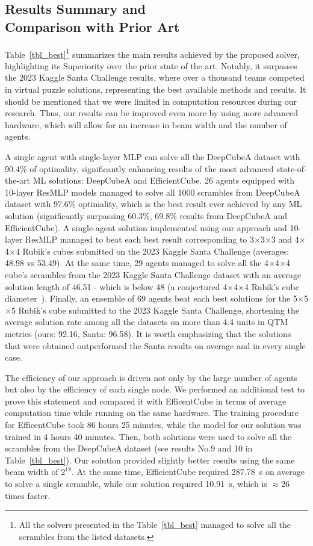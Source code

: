 
\subsection{\label{sec_best} Results Summary and \texorpdfstring{\\}{} Comparison with Prior Art}

Table~\ref{tbl_best}\footnote{All the solvers presented in the Table~\ref{tbl_best} managed to solve all the scrambles from the listed datasets.} summarizes the main results achieved by the proposed solver, highlighting its Superiority over the prior state of the art. Notably, it surpasses the 2023 Kaggle Santa Challenge results, where over a thousand teams competed in virtual puzzle solutions, representing the best available methods and results. It should be mentioned that we were limited in computation resources during our research. Thus, our results can be improved even more by using more advanced hardware, which will allow for an increase in beam width and the number of agents.

A single agent with single-layer MLP can solve all the DeepCubeA dataset with 90.4\% of optimality, significantly enhancing results of the most advanced state-of-the-art ML solutions: DeepCubeA and EfficientCube. 26 agents equipped with 10-layer ResMLP models managed to solve all 1000 scrambles from DeepCubeA dataset with 97.6\% optimality, which is the best result ever achieved by any ML solution (significantly surpassing 60.3\%, 69.8\% results from DeepCubeA and EfficientCube). A single-agent solution implemented using our approach and 10-layer ResMLP managed to beat each best result corresponding to 3$\times$3$\times$3 and 4$\times$4$\times$4 Rubik's cubes submitted on the 2023 Kaggle Santa Challenge (averages: 48.98 vs 53.49). At the same time, 29 agents managed to solve all the 4$\times$4$\times$4 cube's scrambles from the 2023 Kaggle Santa Challenge dataset with an average solution length of 46.51 - which is below 48 (a conjectured 4$\times$4$\times$4 Rubik's cube diameter~\cite{hirata2024probabilistic}). Finally, an ensemble of 69 agents beat each best solutions for the 5$\times$5$\times$5 Rubik's cube submitted to the 2023 Kaggle Santa Challenge, shortening the average solution rate among all the datasets on more than 4.4 units in QTM metrics (ours: 92.16, Santa: 96.58). It is worth emphasizing that the solutions that were obtained outperformed the Santa results on average and in every single case.

The efficiency of our approach is driven not only by the large number of agents but also by the efficiency of each single node. We performed an additional test to prove this statement and compared it with EfficentCube in terms of average computation time while running on the same hardware. The training procedure for EfficentCube took 86 hours 25 minutes, while the model for our solution was trained in 4 hours 40 minutes. Then, both solutions were used to solve all the scrambles from the DeepCubeA dataset (see results No.9 and 10 in Table~\ref{tbl_best}). Our solution provided slightly better results using the same beam width of $2^{18}$. At the same time, EfficientCube required 287.78~s on average to solve a single scramble, while our solution required 10.91~s, which is $\approx26$ times faster.
